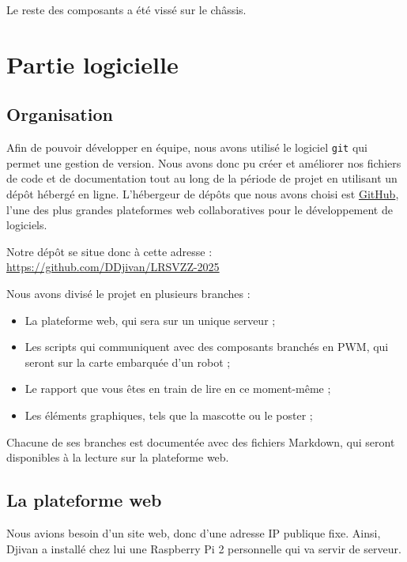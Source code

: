 \documentclass[a4paper,12pt]{report}  %
\begin{document}
Le reste des composants a été vissé sur le châssis.

\pagebreak
\section{Partie logicielle}
\subsection{Organisation}

Afin de pouvoir développer en équipe, nous avons utilisé le logiciel \texttt{git} qui permet une gestion de version. Nous avons donc pu créer et améliorer nos fichiers de code et de documentation tout au long de la période de projet en utilisant un dépôt hébergé en ligne. L'hébergeur de dépôts que nous avons choisi est \href{https://github.com/}{GitHub}, l'une des plus grandes plateformes web collaboratives pour le développement de logiciels. 

Notre dépôt se situe donc à cette adresse : \href{https://github.com/DDjivan/LRSVZZ-2025}{https://github.com/DDjivan/LRSVZZ-2025}

Nous avons divisé le projet en plusieurs branches : 

\begin{itemize}
	\item La plateforme web, qui sera sur un unique serveur ; 
	
	\item Les scripts qui communiquent avec des composants branchés en PWM, qui seront sur la carte embarquée d'un robot ; 
	
	\item Le rapport que vous êtes en train de lire en ce moment-même ; 
	
	\item Les éléments graphiques, tels que la mascotte ou le poster ; 
	
\end{itemize}

Chacune de ses branches est documentée avec des fichiers Markdown, qui seront disponibles à la lecture sur la plateforme web. 


\subsection{La plateforme web}

Nous avions besoin d'un site web, donc d'une adresse IP publique fixe. Ainsi, Djivan a installé chez lui une Raspberry Pi 2 personnelle qui va servir de serveur. 
\end{document}
